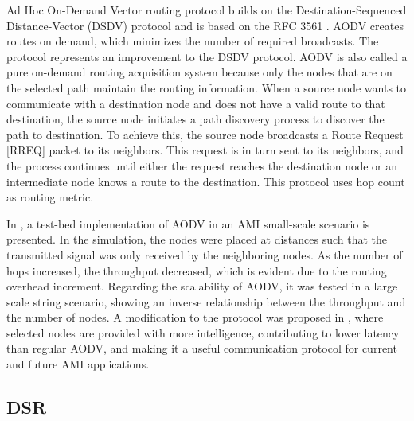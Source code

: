 \documentclass[11pt,draftclsnofoot,onecolumn]{IEEEtran}
\begin{document}
Ad Hoc On-Demand Vector routing protocol builds on the Destination-Sequenced Distance-Vector (DSDV) protocol and is based on the RFC 3561 \cite{Perkins2003}. AODV creates routes on demand, which minimizes the number of required broadcasts. The protocol represents an improvement to the DSDV protocol. AODV is also called a pure on-demand routing acquisition system because only the nodes that are on the selected path maintain the routing information.  When a source node wants to communicate with a destination node and does not have a valid route to that destination, the source node initiates a path discovery process to discover the path to destination. To achieve this, the source node broadcasts a Route Request [RREQ] packet to its neighbors. This request is in turn sent to its neighbors, and the process continues until either the request reaches the destination node or an intermediate node knows a route to the destination. This protocol uses hop count as routing metric.

In \cite{Toimoor2013}, a test-bed implementation of AODV in an AMI small-scale scenario is presented. In the simulation, the nodes were placed at distances such that the transmitted signal was only received by the neighboring nodes. As the number of hops increased, the throughput decreased, which is evident due to the routing overhead increment. Regarding the scalability of AODV, it was tested in a large scale string scenario, showing an inverse relationship between the throughput and the number of nodes. A modification to the protocol was proposed in \cite{Toimoor2013}, where selected nodes are provided with more intelligence, contributing to lower latency than regular AODV, and making it a useful communication protocol for current and future AMI applications.


\subsection{DSR}\label{dsr}
\end{document}
